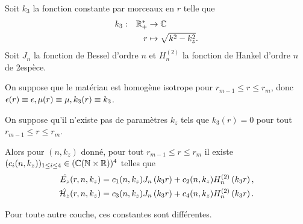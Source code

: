   \begin{defn}
    Soit \(k_3\) la fonction constante par morceaux en \(r\) telle que
    \begin{equation*}
      \begin{aligned} &k_3: & \mathbb R_+^* &\rightarrow \mathbb C \\ & & r & \mapsto \sqrt{k^2 - k_z^2}. \end{aligned}
    \end{equation*}
    Soit \(J_n\) la fonction de Bessel d'ordre \(n\) et \(H_n^{(2)}\) la fonction de Hankel d'ordre \(n\) de 2\ieme espèce.
  \end{defn}

  \begin{prop}
    On suppose que le matériau est homogène isotrope pour \(r_{m-1}\le r \le r_m\), donc \(\epsilon(r)\equiv \epsilon, \mu(r)\equiv \mu, k_3(r)\equiv k_3\).

    On suppose qu'il n'existe pas de paramètres \(k_z\) tels que \(k_3(r) = 0\) pour tout \(r_{m-1}\le r \le r_m\).

    Alors pour \((n,k_z)\) donné, pour tout \(r_{m-1}\le r \le r_m\) il existe \((c_i(n,k_z))_{1\le i\le 4} \in (\mathbb C(\mathbb N\times\mathbb R))^4\) telles que 
    \begin{subequations}
      \begin{align*}
        \hat{E_z}(r,n,k_z) &= c_1(n,k_z) J_n\left(k_3r\right) + c_2(n,k_z) H_n^{(2)}\left(k_3r\right),
        \\
        \hat{\mathcal{H}_z}(r,n,k_z) &= c_3(n,k_z) J_n\left(k_3r\right) + c_4(n,k_z) H_n^{(2)}\left(k_3r\right).
      \end{align*}
    \end{subequations}
  \end{prop}
  Pour toute autre couche, ces constantes sont différentes.
